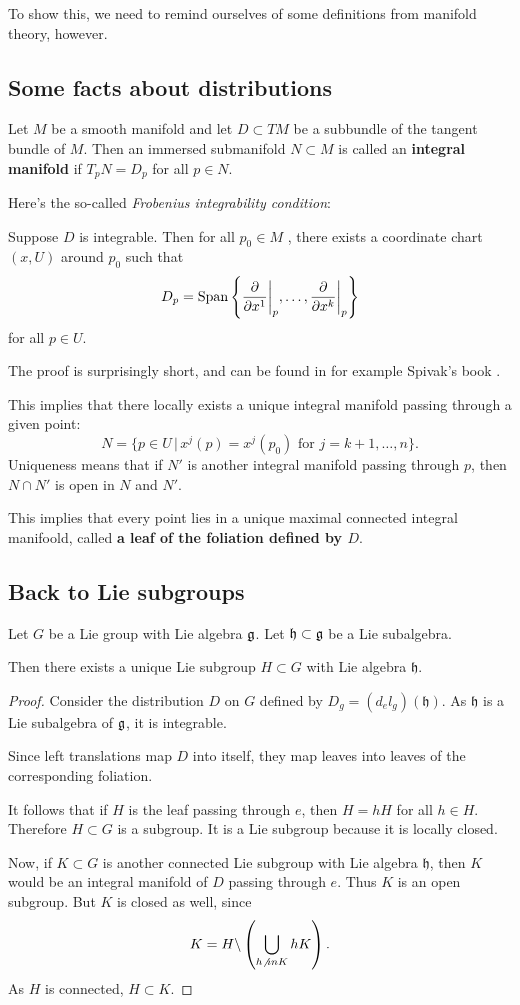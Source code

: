 \documentclass[11pt, english]{article}
\begin{document}
To show this, we need to remind ourselves of some definitions from manifold theory, however.

\subsection{Some facts about distributions}

Let $M$ be a smooth manifold and let $D \subset TM$ be a subbundle of the tangent bundle of $M$. Then an immersed submanifold $N \subset M$ is called an \textbf{integral manifold} if $T_pN = D_p$ for all $p \in N$.

Here's the so-called \emph{Frobenius integrability condition}:

\begin{thm}
Suppose $D$ is integrable. Then for all $p_0 \in M$ , there exists a coordinate chart $(x,U)$ around $p_0$ such that
$$
D_p = \Span \left\{ \restr{\frac{\partial}{\partial x^1}}{p}, \ldots, \restr{\frac{\partial}{\partial x^k}}{p} \right\} 
$$
for all $p \in U$.
\end{thm}
The proof is surprisingly short, and can be found in for example Spivak's book \cite{spivak_manifolds}. 

This implies that there locally exists a unique integral manifold passing through a given point:
$$
N = \{ p \in U \, | \, x^{j}(p) = x^{j}(p_0) \text{ for } j=k+1,\ldots,n \}.
$$
Uniqueness means that if $N'$ is another integral manifold passing through $p$, then $N \cap N'$ is open in $N$ and $N'$. 

This implies that every point lies in a unique maximal connected integral manifoold, called \textbf{a leaf of the foliation defined by $D$}.

\subsection{Back to Lie subgroups}

\begin{thm}
Let $G$ be a Lie group with Lie algebra $\mathfrak g$. Let $\mathfrak h \subset \mathfrak g$ be a Lie subalgebra.

Then there exists a unique Lie subgroup $H \subset G$ with Lie algebra $\mathfrak h$.
\end{thm}
\begin{proof}
  Consider the distribution $D$ on $G$ defined by $D_g = (d_el_g)(\mathfrak h)$. As $\mathfrak h$ is a Lie subalgebra of $\mathfrak g$, it is integrable.

Since left translations map $D$ into itself, they map leaves into leaves of the corresponding foliation. 

It follows that if $H$ is the leaf passing through $e$, then $H=hH$ for all $h \in H$. Therefore $H \subset G$ is a subgroup. It is a Lie subgroup because it is locally closed.

Now, if $K \subset G$ is another connected Lie subgroup with Lie algebra $\mathfrak h$, then $K$ would be an integral manifold of $D$ passing through $e$. Thus $K$ is an open subgroup. But $K$ is closed as well, since
$$
K = H \backslash \left(\bigcup_{h \not \ in K} h K\right).
$$
As $H$ is connected, $H \subset K$.
\end{proof}
\end{document}
